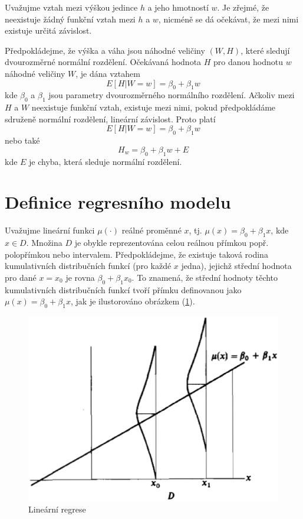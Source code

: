\begin{example}
Uvažujme vztah mezi výškou jedince $h$ a jeho hmotností $w$. Je zřejmé, že neexistuje žádný funkční vztah mezi $h$ a $w$, nicméně se dá očekávat, že mezi nimi existuje určitá závislost.

Předpokládejme, že výška a váha jsou náhodné veličiny $(W,H)$, které sledují dvourozměrné normální rozdělení. Očekávaná hodnota $H$ pro danou hodnotu $w$ náhodné veličiny $W$, je dána vztahem
\begin{equation*}
E[H|W = w] = \beta_0 + \beta_1 w
\end{equation*}
kde $\beta_0$ a $\beta_1$ jsou parametry dvourozměrného normálního rozdělení. Ačkoliv mezi $H$ a $W$ neexistuje funkční vztah, existuje mezi nimi, pokud předpokládáme sdruženě normální rozdělení, lineární závislost. Proto platí
\begin{equation*}
E[H|W = w] = \beta_0 + \beta_1w
\end{equation*}
nebo také
\begin{equation*}
H_w = \beta_0 + \beta_1 w + E
\end{equation*}
kde $E$ je chyba, která sleduje normální rozdělení.
\end{example}

\section{Definice regresního modelu}

Uvažujme lineární funkci $\mu(\cdot)$ reálné proměnné $x$, tj. $\mu(x) = \beta_0 + \beta_1 x$, kde $x \in D$. Množina $D$ je obykle reprezentována celou reálnou přímkou popř. polopřímkou nebo intervalem. Předpokládejme, že existuje taková rodina kumulativních distribučních funkcí (pro každé $x$ jedna), jejichž střední hodnota pro dané $x = x_0$ je rovna $\beta_0 + \beta_1 x_0$. To znamená, že střední hodnoty těchto kumulativních distribučních funkcí tvoří přímku definovanou jako $\mu(x) = \beta_0 + \beta_1x$, jak je ilustorováno obrázkem (\ref{linear-model}).

\begin{figure}[htp]
\centering
\includegraphics[scale = 0.5]{pictures/linear_model.eps}
\caption{Lineární regrese}
\label{linear-model}
\end{figure}

